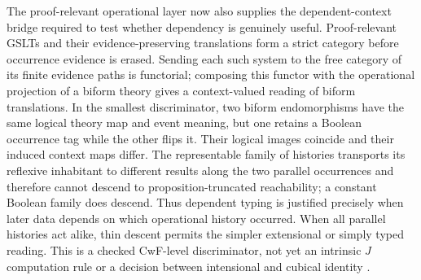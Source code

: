\documentclass[11pt]{article}
\theoremstyle{definition}
\theoremstyle{remark}
\begin{document}
The proof-relevant operational layer now also supplies the dependent-context
bridge required to test whether dependency is genuinely useful.  Proof-relevant
GSLTs and their evidence-preserving translations form a strict category before
occurrence evidence is erased.  Sending each such system to the free category
of its finite evidence paths is functorial; composing this functor with the
operational projection of a biform theory gives a context-valued reading of
biform translations.  In the smallest discriminator, two biform endomorphisms
have the same logical theory map and event meaning, but one retains a Boolean
occurrence tag while the other flips it.  Their logical images coincide and
their induced context maps differ.  The representable family of histories
transports its reflexive inhabitant to different results along the two parallel
occurrences and therefore cannot descend to proposition-truncated reachability;
a constant Boolean family does descend.  Thus dependent typing is justified
precisely when later data depends on which operational history occurred.  When
all parallel histories act alike, thin descent permits the simpler extensional
or simply typed reading.  This is a checked CwF-level discriminator, not yet an
intrinsic $J$ computation rule or a decision between intensional and cubical
identity \cite{MartinLofITT,CaretteFarmerSharodaBiform}.
\end{document}
